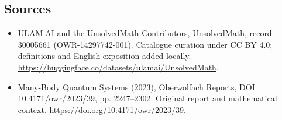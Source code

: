 \documentclass[11pt]{article}
\begin{document}
\subsection{Sources}
\begin{itemize}
\item[\hypertarget{source:30005661:1}{S1}] ULAM.AI and the UnsolvedMath Contributors, UnsolvedMath, record 30005661 (OWR-14297742-001). Catalogue curation under CC BY 4.0; definitions and English exposition added locally.
\url{https://huggingface.co/datasets/ulamai/UnsolvedMath}.
\item[\hypertarget{source:30005661:2}{S2}] Many-Body Quantum Systems (2023), Oberwolfach Reports, DOI 10.4171/owr/2023/39, pp. 2247--2302. Original report and mathematical context.
\url{https://doi.org/10.4171/owr/2023/39}.
\end{itemize}
\label{end:30005661}
\end{document}
